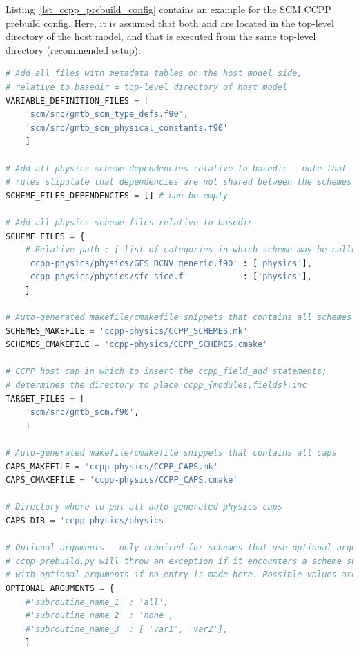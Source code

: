 Listing~\ref{lst_ccpp_prebuild_config} contains an example for the SCM CCPP prebuild config. Here, it is assumed that both  and  are located in the top-level directory of the host model, and that  is executed from the same top-level directory (recommended setup).
\begin{lstlisting}[language=python,
                 basicstyle=\scriptsize\ttfamily,
                 label=lst_ccpp_prebuild_config,
                 float=p,
                 caption=CCPP prebuild config for SCM (shortened)]
# Add all files with metadata tables on the host model side,
# relative to basedir = top-level directory of host model
VARIABLE_DEFINITION_FILES = [
    'scm/src/gmtb_scm_type_defs.f90',
    'scm/src/gmtb_scm_physical_constants.f90'
    ]

# Add all physics scheme dependencies relative to basedir - note that the CCPP
# rules stipulate that dependencies are not shared between the schemes!
SCHEME_FILES_DEPENDENCIES = [] # can be empty

# Add all physics scheme files relative to basedir
SCHEME_FILES = {
    # Relative path : [ list of categories in which scheme may be called ]
    'ccpp-physics/physics/GFS_DCNV_generic.f90' : ['physics'],
    'ccpp-physics/physics/sfc_sice.f'           : ['physics'],
    }

# Auto-generated makefile/cmakefile snippets that contains all schemes
SCHEMES_MAKEFILE = 'ccpp-physics/CCPP_SCHEMES.mk'
SCHEMES_CMAKEFILE = 'ccpp-physics/CCPP_SCHEMES.cmake'

# CCPP host cap in which to insert the ccpp_field_add statements;
# determines the directory to place ccpp_{modules,fields}.inc
TARGET_FILES = [
    'scm/src/gmtb_scm.f90',
    ]

# Auto-generated makefile/cmakefile snippets that contains all caps
CAPS_MAKEFILE = 'ccpp-physics/CCPP_CAPS.mk'
CAPS_CMAKEFILE = 'ccpp-physics/CCPP_CAPS.cmake'

# Directory where to put all auto-generated physics caps
CAPS_DIR = 'ccpp-physics/physics'

# Optional arguments - only required for schemes that use optional arguments.
# ccpp_prebuild.py will throw an exception if it encounters a scheme subroutine
# with optional arguments if no entry is made here. Possible values are:
OPTIONAL_ARGUMENTS = {
    #'subroutine_name_1' : 'all',
    #'subroutine_name_2' : 'none',
    #'subroutine_name_3' : [ 'var1', 'var2'],
    }


\end{lstlisting}
